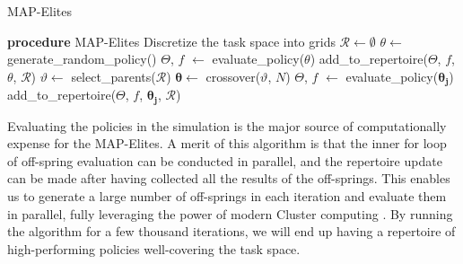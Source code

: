 \documentclass[journal]{IEEEtran}
\begin{document}
\begin{algorithm}
\caption{MAP-Elites}
\begin{algorithmic}
\STATE \textbf{procedure} MAP-Elites
\STATE Discretize the task space into grids
\STATE $\mathcal{R} \leftarrow \emptyset$ 
\STATE $\theta \leftarrow $ generate{\_}random{\_}policy()
\STATE $\Theta$, $f$ $\leftarrow$ evaluate{\_}policy($\theta$) 
\STATE add{\_}to{\_}repertoire($\Theta$, $f$, $\theta$, $\mathcal{R}$) 
\ENDFOR
{}
\STATE $\vartheta \leftarrow$ select{\_}parents($\mathcal{R}$)
\STATE $\bm{\theta} \leftarrow$ crossover($\vartheta$, $N$) 
\STATE $\Theta$, $f$ $\leftarrow$ evaluate{\_}policy($\bm{\theta_j}$)
\STATE add{\_}to{\_}repertoire($\Theta$, $f$, $\bm{\theta_j}$, $\mathcal{R}$)
\ENDFOR
\ENDFOR
\end{algorithmic}
\label{MAP-Elites}
\end{algorithm}
\noindent
Evaluating the policies in the simulation is the major source of computationally expense for the MAP-Elites.
A merit of this algorithm is that the inner for loop of off-spring evaluation can be conducted in parallel, and the repertoire update can be made after having collected all the results of the off-springs.
This enables us to generate a large number of off-springs in each iteration and evaluate them in parallel, fully leveraging the power of modern Cluster computing \cite{Q-Dax}.
By running the algorithm for a few thousand iterations, we will end up having a repertoire of high-performing policies well-covering the task space.
\end{document}
